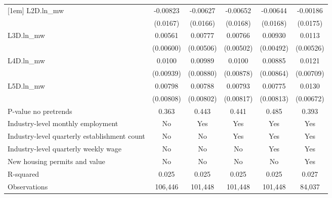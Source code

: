{\begin{tabular}{l*{5}{c}}
[1em]
L2D.ln\_mw & -0.00823         & -0.00627         & -0.00652         & -0.00644         & -0.00186         \\
          & (0.0167)         & (0.0166)         & (0.0168)         & (0.0168)         & (0.0175)         \\
[1em]
L3D.ln\_mw &  0.00561         &  0.00777         &  0.00766         &  0.00930\sym{*}  &   0.0113\sym{**} \\
          &(0.00600)         &(0.00506)         &(0.00502)         &(0.00492)         &(0.00526)         \\
[1em]
L4D.ln\_mw &   0.0100         &  0.00989         &   0.0100         &  0.00885         &   0.0121\sym{*}  \\
          &(0.00939)         &(0.00880)         &(0.00878)         &(0.00864)         &(0.00709)         \\
[1em]
L5D.ln\_mw &  0.00798         &  0.00788         &  0.00793         &  0.00775         &   0.0130\sym{*}  \\
          &(0.00808)         &(0.00802)         &(0.00817)         &(0.00813)         &(0.00672)         \\
\hline
P-value no pretrends&    0.363         &    0.443         &    0.441         &    0.485         &    0.393         \\
Industry-level monthly employment&       No         &      Yes         &      Yes         &      Yes         &      Yes         \\
Industry-level quarterly establishment count&       No         &       No         &      Yes         &      Yes         &      Yes         \\
Industry-level quarterly weekly wage&       No         &       No         &       No         &      Yes         &      Yes         \\
New housing permits and value&       No         &       No         &       No         &       No         &      Yes         \\
R-squared &    0.025         &    0.025         &    0.025         &    0.025         &    0.027         \\
Observations&  106,446         &  101,448         &  101,448         &  101,448         &   84,037         \\
\hline\hline
\end{tabular}
}
